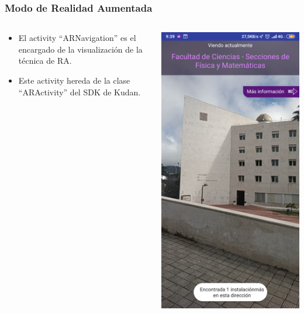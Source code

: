 \begin{frame}
	\frametitle{Modo de Realidad Aumentada}
	\begin{columns}
		\begin{column}{0.6\textwidth}
			\begin{itemize}
				\item El activity ``ARNavigation'' es el encargado de la visualización de la técnica de RA.
				\item Este activity hereda de la clase ``ARActivity'' del SDK de Kudan.
			\end{itemize}
			\endblock{}
		\end{column}
		\begin{column}{0.4\textwidth} 
			\vfill 
			\begin{center}
				\includegraphics[width=0.7\linewidth]{Images/ar}
			\end{center}
		\end{column}
	\end{columns}
\end{frame}

